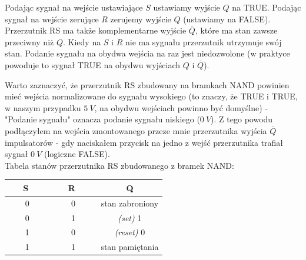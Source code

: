 \documentclass[14pt, table]{extarticle}
\begin{document}
Podając sygnał na wejście ustawiające $S$ ustawiamy wyjście $Q$ na TRUE. Podając sygnał na wejście zerujące $R$ zerujemy wyjście $Q$ (ustawiamy na FALSE). Przerzutnik RS ma także komplementarne wyjście $\overline{Q}$, które ma stan zawsze przeciwny niż $Q$. Kiedy na $S$ i $R$ nie ma sygnału przerzutnik utrzymuje swój stan. Podanie sygnału na obydwa wejścia na raz jest niedozwolone (w praktyce powoduje to sygnał TRUE na obydwu wyjściach $Q$ i $\overline{Q}$). 

\begin{center}
\end{center}

Warto zaznaczyć, że przerzutnik RS zbudowany na bramkach NAND powinien mieć wejścia normalizowane do sygnału wysokiego (to znaczy, że TRUE i TRUE, w naszym przypadku $5 \ V$, na obydwu wejściach powinno być domyślne) - "Podanie sygnału" oznacza podanie sygnału niskiego ($0 \ V$). Z tego powodu podłączyłem na wejścia zmontowanego przeze mnie przerzutnika wyjścia $\overline{Q}$ impulsatorów - gdy naciskałem przycisk na jedno z wejść przerzutnika trafiał sygnał $0 \ V$ (logiczne FALSE). \\

Tabela stanów przerzutnika RS zbudowanego z bramek NAND:

{
\centering
\begin{center}
\begin{tabular}{ | c | c | c | } 
  \hline
  \ \ \ \textbf{S} \ \ \ & \ \ \ \textbf{R} \ \ \ & \textbf{Q} \\ 
  \hline
  0 & 0 & stan zabroniony \\
  \hline
  0 & 1 & \textit{(set)} 1 \\
  \hline
  1 & 0 & \textit{(reset)} 0 \\
  \hline
  1 & 1 & stan pamiętania \\
  \hline
\end{tabular}
\end{center}
}
\end{document}
